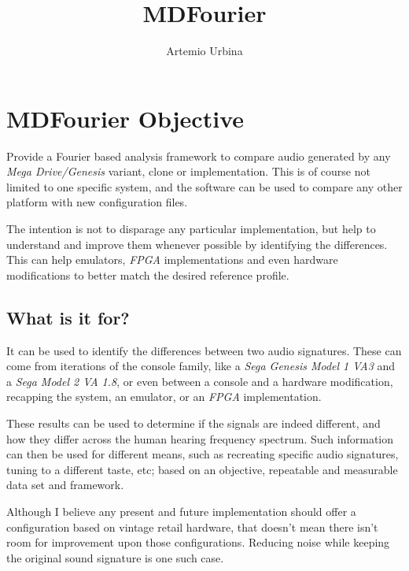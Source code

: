 \documentclass[10pt,a4paper]{report}
\title{MDFourier}
\author{Artemio Urbina}
\begin{document}
\begin{titlepage}
	\maketitle
	\thispagestyle{empty}
\end{titlepage}

\tableofcontents

\chapter{MDFourier Objective}

Provide a Fourier based analysis framework to compare audio generated by any \textit{Mega Drive/Genesis} variant, clone or implementation. This is of course not limited to one specific system, and the software can be used to compare any other platform with new configuration files.

The intention is not to disparage any particular implementation, but help to understand and improve them whenever possible by identifying the differences. This can help emulators, \textit{FPGA} implementations and even hardware modifications to better match the desired reference profile.

\section{What is it for?}

It can be used to identify the differences between two audio signatures. These can come from iterations of the console family, like a \textit{Sega Genesis Model 1 VA3} and a \textit{Sega Model 2 VA 1.8}, or even between a console and a hardware modification, recapping the system, an emulator, or an \textit{FPGA} implementation.

These results can be used to determine if the signals are indeed different, and how they differ across the human hearing frequency spectrum. Such information can then be used for different means, such as recreating specific audio signatures, tuning to a different taste, etc; based on an objective, repeatable and measurable data set and framework.

Although I believe any present and future implementation should offer a configuration based on vintage retail hardware, that doesn't mean there isn't room for improvement upon those configurations. Reducing noise while keeping the original sound signature is one such case.
\end{document}
